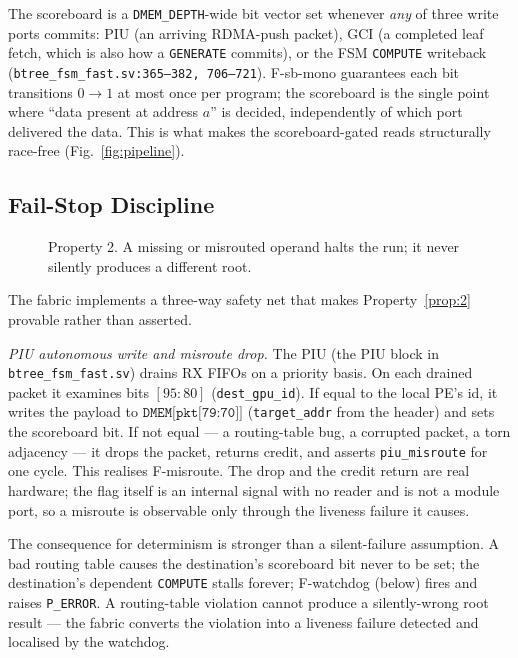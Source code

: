 \documentclass[journal,10pt]{IEEEtran}
\theoremstyle{plain}
\theoremstyle{definition}
\theoremstyle{remark}
\newcommand{\sv}[1]{\texttt{#1}}
\begin{document}
The scoreboard is a \sv{DMEM\_DEPTH}-wide bit vector set whenever \emph{any}
of three write ports commits: PIU (an arriving RDMA-push packet), GCI (a
completed leaf fetch, which is also how a \texttt{GENERATE} commits), or the
FSM \texttt{COMPUTE} writeback (\sv{btree\_fsm\_fast.sv:365--382, 706--721}).
\textsf{F-sb-mono} guarantees each bit transitions $0 \to 1$ at
most once per program; the scoreboard is the single point where
``data present at address $a$'' is decided, independently of which port
delivered the data. This is what makes the scoreboard-gated
reads structurally race-free (Fig.~\ref{fig:pipeline}).

\subsection{Fail-Stop Discipline}\label{sec:fail-stop}

\begin{figure}[!t]\centering

\caption{Property 2. A missing or misrouted operand halts the run; it never silently produces a different root.}\label{fig:failstop}
\end{figure}


The fabric implements a three-way safety net that makes Property~\ref{prop:2}
provable rather than asserted.

\emph{PIU autonomous write and misroute drop.} The PIU
(the PIU block in \sv{btree\_fsm\_fast.sv}) drains RX FIFOs on a priority basis.
On each drained packet it examines bits $[95{:}80]$ (\sv{dest\_gpu\_id}).
If equal to the local PE's id, it writes the payload to
$\texttt{DMEM[pkt[79:70]]}$ (\sv{target\_addr} from the header) and sets
the scoreboard bit. If not equal --- a routing-table bug, a corrupted
packet, a torn adjacency --- it drops the packet, returns credit, and
asserts \texttt{piu\_misroute} for one cycle. This realises
\textsf{F-misroute}. The drop and the credit return are real hardware; the
flag itself is an internal signal with no reader and is not a module port,
so a misroute is observable only through the liveness failure it causes.

The consequence for determinism is stronger than a silent-failure
assumption. A bad routing table causes the destination's scoreboard bit
never to be set; the destination's dependent \texttt{COMPUTE} stalls
forever; \textsf{F-watchdog} (below) fires and raises \texttt{P\_ERROR}.
A routing-table violation cannot produce a silently-wrong root result ---
the fabric converts the violation into a liveness failure detected and
localised by the watchdog.
\end{document}
